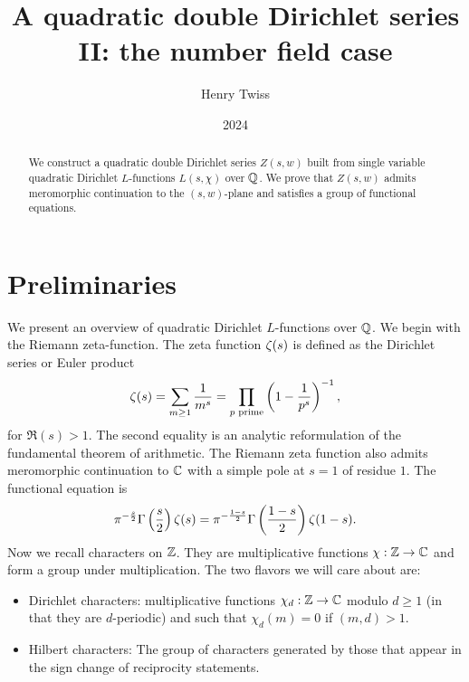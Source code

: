\documentclass[12pt,reqno,oneside]{amsart}
\title{A quadratic double Dirichlet series II: the number field case}
\author{Henry Twiss}
\date{2024}
\begin{document}
\begin{abstract}
    We construct a quadratic double Dirichlet series $Z(s,w)$ built from single variable quadratic Dirichlet $L$-functions $L(s,\chi)$ over $\mathbb{Q}$. We prove that $Z(s,w)$ admits meromorphic continuation to the $(s,w)$-plane and satisfies a group of functional equations.
\end{abstract}

\maketitle

\section{Preliminaries}
    We present an overview of quadratic Dirichlet $L$-functions over $\mathbb{Q}$. We begin with the Riemann zeta-function. The zeta function $\zeta(s)$ is defined as the Dirichlet series or Euler product
    \[
        \zeta(s) = \sum_{m \ge 1}\frac{1}{m^{s}} = \prod_{\text{$p$ prime}}\left(1-\frac{1}{p^{s}}\right)^{-1},
    \]
    for $\Re(s) > 1$. The second equality is an analytic reformulation of the fundamental theorem of arithmetic. The Riemann zeta function also admits meromorphic continuation to $\mathbb{C}$ with a simple pole at $s = 1$ of residue $1$. The functional equation is
    \[
        \pi^{-\frac{s}{2}}\Gamma\left(\frac{s}{2}\right)\zeta(s) = \pi^{-\frac{1-s}{2}}\Gamma\left(\frac{1-s}{2}\right)\zeta(1-s).
    \]
    Now we recall characters on $\mathbb{Z}$. They are multiplicative functions $\chi:\mathbb{Z} \to \mathbb{C}$ and form a group under multiplication. The two flavors we will care about are:
    
    \begin{itemize}
        \item Dirichlet characters: multiplicative functions $\chi_{d}:\mathbb{Z} \to \mathbb{C}$ modulo $d \ge 1$ (in that they are $d$-periodic) and such that $\chi_{d}(m) = 0$ if $(m,d) > 1$.
        \item Hilbert characters: The group of characters generated by those that appear in the sign change of reciprocity statements.
    \end{itemize}
    
\end{document}
